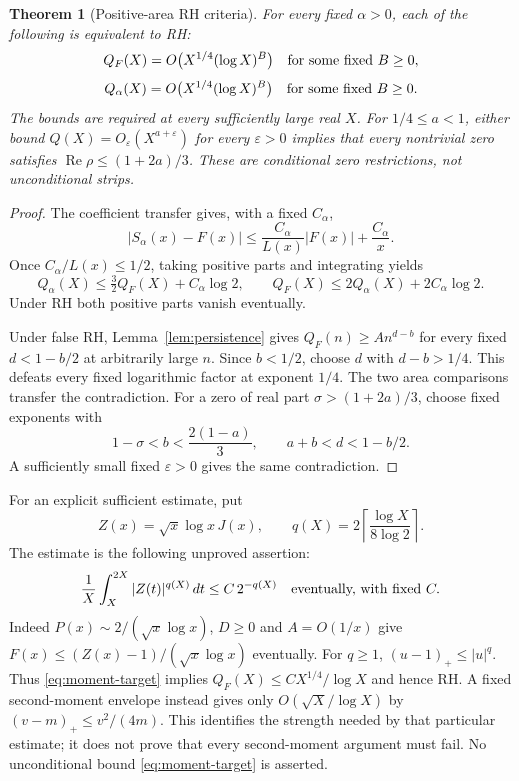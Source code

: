 \documentclass[11pt]{article}
\newtheorem{theorem}{Theorem}[section]
\theoremstyle{definition}
\begin{document}
\begin{theorem}[Positive-area RH criteria]\label{thm:area}
For every fixed $\alpha>0$, each of the following is equivalent to RH:
\[
 Q_F(X)=O\bigl(X^{1/4}(\log X)^B\bigr)
 \quad\hbox{for some fixed }B\ge0,
\]
\[
 Q_\alpha(X)=O\bigl(X^{1/4}(\log X)^B\bigr)
 \quad\hbox{for some fixed }B\ge0.
\]
The bounds are required at every sufficiently large real $X$.
For $1/4\le a<1$, either bound
$Q(X)=O_\varepsilon(X^{a+\varepsilon})$ for every
$\varepsilon>0$ implies that every nontrivial zero satisfies
$\operatorname{Re}\rho\le(1+2a)/3$.
These are conditional zero restrictions, not unconditional strips.
\end{theorem}
\begin{proof}
The coefficient transfer gives, with a fixed $C_\alpha$,
\[
 |S_\alpha(x)-F(x)|
 \le \frac{C_\alpha}{L(x)}|F(x)|+\frac{C_\alpha}{x}.
\]
Once $C_\alpha/L(x)\le1/2$, taking positive parts and integrating yields
\[
 Q_\alpha(X)\le\tfrac32Q_F(X)+C_\alpha\log2,\qquad
 Q_F(X)\le2Q_\alpha(X)+2C_\alpha\log2.
\]
Under RH both positive parts vanish eventually.

Under false RH, Lemma~\ref{lem:persistence} gives
$Q_F(n)\ge A n^{d-b}$ for every fixed $d<1-b/2$ at arbitrarily
large $n$. Since $b<1/2$, choose $d$ with $d-b>1/4$.
This defeats every fixed logarithmic factor at exponent $1/4$.
The two area comparisons transfer the contradiction.
For a zero of real part $\sigma>(1+2a)/3$, choose fixed exponents with
\[
 1-\sigma<b<\frac{2(1-a)}3,\qquad a+b<d<1-b/2.
\]
A sufficiently small fixed $\varepsilon>0$ gives the same contradiction.
\end{proof}

For an explicit sufficient estimate, put
\[
 Z(x)=\sqrt{x}\log x\,J(x),\qquad
 q(X)=2\left\lceil\frac{\log X}{8\log2}\right\rceil.
\]
The estimate is the following unproved assertion:
\begin{equation}\label{eq:moment-target}
 \frac1X\int_X^{2X}|Z(t)|^{q(X)}\,dt\le C\,2^{-q(X)}
 \quad\hbox{eventually, with fixed }C.
\end{equation}
Indeed $P(x)\sim2/(\sqrt{x}\log x)$, $D\ge0$ and $A=O(1/x)$
give $F(x)\le(Z(x)-1)/(\sqrt{x}\log x)$ eventually.
For $q\ge1$, $(u-1)_+\le|u|^q$. Thus
\eqref{eq:moment-target} implies
$Q_F(X)\le C X^{1/4}/\log X$ and hence RH.
A fixed second-moment envelope instead gives only
$O(\sqrt X/\log X)$ by $(v-m)_+\le v^2/(4m)$.
This identifies the strength needed by that particular estimate;
it does not prove that every second-moment argument must fail.
No unconditional bound \eqref{eq:moment-target} is asserted.
\end{document}
